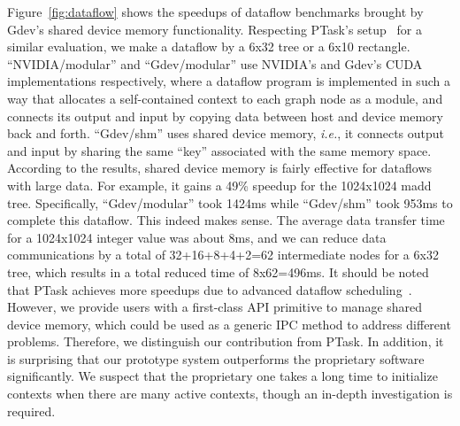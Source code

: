Figure~\ref{fig:dataflow} shows the speedups of dataflow benchmarks
brought by Gdev's shared device memory functionality.
Respecting PTask's setup~\cite{Rossbach_SOSP11} for a similar
evaluation, we make a dataflow by a 6x32 tree or a 6x10 rectangle.
``NVIDIA/modular'' and ``Gdev/modular'' use NVIDIA's and Gdev's CUDA
implementations respectively, where a dataflow program is implemented
in such a way that allocates a self-contained context to each graph node
as a module, and connects its output and input by copying data between
host and device memory back and forth.
``Gdev/shm'' uses shared device memory,
\textit{i.e.}, it connects output and input by sharing the same ``key''
associated with the same memory space.
According to the results, shared device memory is fairly effective for
dataflows with large data.
For example, it gains a 49\% speedup for the 1024x1024 madd tree.
Specifically, ``Gdev/modular'' took 1424ms while ``Gdev/shm'' took 953ms
to complete this dataflow. 
This indeed makes sense.
The average data transfer time for a 1024x1024 integer value was about
8ms, and we can reduce data communications by a total of
32+16+8+4+2=62 intermediate nodes for a 6x32 tree, which results in a
total reduced time of 8x62=496ms.
It should be noted that PTask achieves more speedups due to advanced
dataflow scheduling~\cite{Rossbach_SOSP11}.
However, we provide users with a first-class API primitive to manage
shared device memory, which could be used as a generic IPC method to
address different problems.
Therefore, we distinguish our contribution from PTask.
In addition, it is surprising that our prototype system outperforms the
proprietary software significantly.
We suspect that the proprietary one takes a long time to initialize
contexts when there are many active contexts, though an in-depth
investigation is required.

